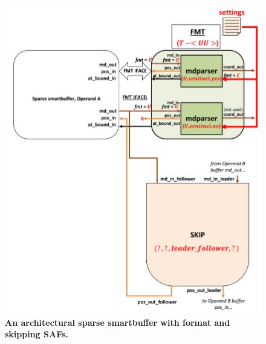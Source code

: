 \begin{figure}[ht]
\includegraphics[width=\textwidth]{figures/safinference_build_06mdparserstratcust.png}
\caption{\textbf{An architectural sparse smartbuffer with format and skipping SAFs.}}
\label{fig:safinference_build_06mdparserstratcust}
\centering
\end{figure}



